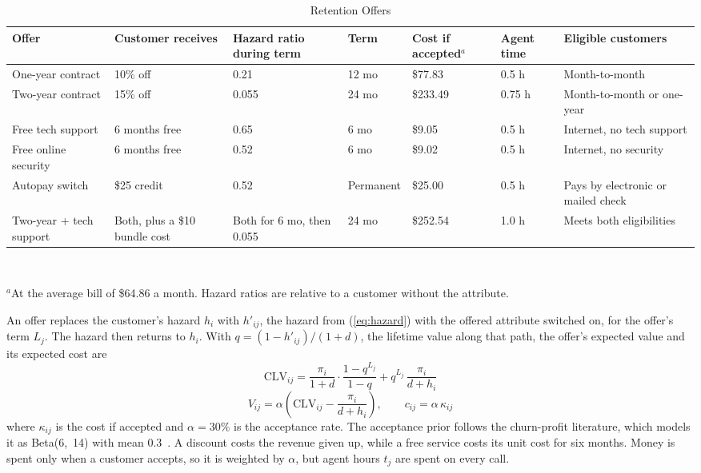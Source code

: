\documentclass[conference]{IEEEtran}
\begin{document}
\begin{table}[!t]
\caption{Retention Offers}
\label{tab:offers}
\centering
\footnotesize
\setlength{\tabcolsep}{4pt}
\begin{tabular}{@{}L{2.7cm}L{3.0cm}L{2.9cm}L{1.4cm}L{1.6cm}L{1.2cm}L{3.4cm}@{}}
\toprule
\textbf{Offer} & \textbf{Customer receives} & \textbf{Hazard ratio during term} & \textbf{Term} & \textbf{Cost if accepted$^{a}$} & \textbf{Agent time} & \textbf{Eligible customers} \\
\midrule
One-year contract & 10\% off & 0.21 & 12 mo & \$77.83 & 0.5 h & Month-to-month \\
Two-year contract & 15\% off & 0.055 & 24 mo & \$233.49 & 0.75 h & Month-to-month or one-year \\
Free tech support & 6 months free & 0.65 & 6 mo & \$9.05 & 0.5 h & Internet, no tech support \\
Free online security & 6 months free & 0.52 & 6 mo & \$9.02 & 0.5 h & Internet, no security \\
Autopay switch & \$25 credit & 0.52 & Permanent & \$25.00 & 0.5 h & Pays by electronic or mailed check \\
Two-year + tech support & Both, plus a \$10 bundle cost & Both for 6 mo, then 0.055 & 24 mo & \$252.54 & 1.0 h & Meets both eligibilities \\
\bottomrule
\end{tabular}\\[3pt]
\parbox{\textwidth}{\scriptsize $^{a}$At the average bill of \$64.86 a month. Hazard ratios are relative to a customer without the attribute.}
\end{table}

An offer replaces the customer's hazard $h_i$ with $h'_{ij}$, the hazard from (\ref{eq:hazard}) with the offered attribute switched on, for the offer's term $L_j$. The hazard then returns to $h_i$. With $q = (1 - h'_{ij})/(1 + d)$, the lifetime value along that path, the offer's expected value and its expected cost are
\begin{equation}
\mathrm{CLV}_{ij} = \frac{\pi_i}{1+d}\cdot\frac{1-q^{L_j}}{1-q} + q^{L_j}\,\frac{\pi_i}{d+h_i}
\label{eq:clvoffer}
\end{equation}
\begin{equation}
V_{ij} = \alpha\left(\mathrm{CLV}_{ij} - \frac{\pi_i}{d+h_i}\right), \qquad c_{ij} = \alpha\,\kappa_{ij}
\label{eq:value}
\end{equation}
where $\kappa_{ij}$ is the cost if accepted and $\alpha = 30\%$ is the acceptance rate. The acceptance prior follows the churn-profit literature, which models it as Beta(6,~14) with mean 0.3~\cite{b3}. A discount costs the revenue given up, while a free service costs its unit cost for six months. Money is spent only when a customer accepts, so it is weighted by $\alpha$, but agent hours $t_j$ are spent on every call.
\end{document}
